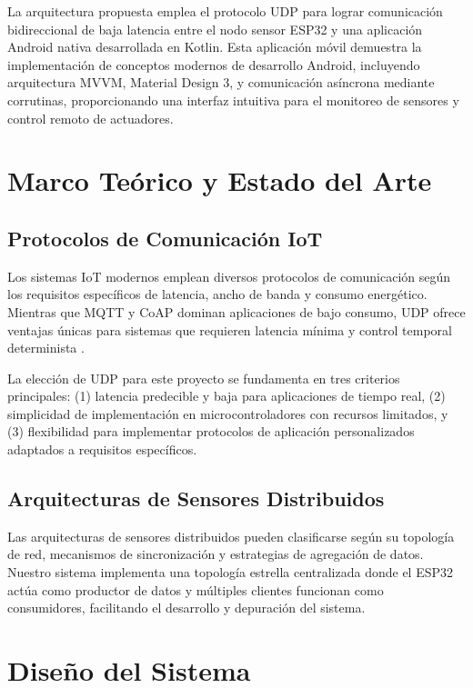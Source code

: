 \documentclass[conference,a4paper]{IEEEtran}
\begin{document}
La arquitectura propuesta emplea el protocolo UDP para lograr comunicaci\'on bidireccional de baja latencia entre el nodo sensor ESP32 y una aplicaci\'on Android nativa desarrollada en Kotlin. Esta aplicaci\'on m\'ovil demuestra la implementaci\'on de conceptos modernos de desarrollo Android, incluyendo arquitectura MVVM, Material Design 3, y comunicaci\'on as\'incrona mediante corrutinas, proporcionando una interfaz intuitiva para el monitoreo de sensores y control remoto de actuadores.

\section{Marco Te\'orico y Estado del Arte}

\subsection{Protocolos de Comunicaci\'on IoT}

Los sistemas IoT modernos emplean diversos protocolos de comunicaci\'on seg\'un los requisitos espec\'ificos de latencia, ancho de banda y consumo energ\'etico. Mientras que MQTT y CoAP dominan aplicaciones de bajo consumo, UDP ofrece ventajas \'unicas para sistemas que requieren latencia m\'inima y control temporal determinista \cite{mqtt_comparison}.

La elecci\'on de UDP para este proyecto se fundamenta en tres criterios principales: (1) latencia predecible y baja para aplicaciones de tiempo real, (2) simplicidad de implementaci\'on en microcontroladores con recursos limitados, y (3) flexibilidad para implementar protocolos de aplicaci\'on personalizados adaptados a requisitos espec\'ificos.

\subsection{Arquitecturas de Sensores Distribuidos}

Las arquitecturas de sensores distribuidos pueden clasificarse seg\'un su topolog\'ia de red, mecanismos de sincronizaci\'on y estrategias de agregaci\'on de datos. Nuestro sistema implementa una topolog\'ia estrella centralizada donde el ESP32 act\'ua como productor de datos y m\'ultiples clientes funcionan como consumidores, facilitando el desarrollo y depuraci\'on del sistema.

\section{Dise\~{n}o del Sistema}
\end{document}

